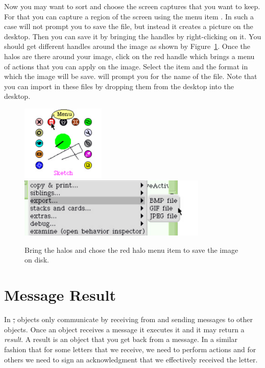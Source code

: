 Now you may want to sort and choose the screen captures that you want to keep. For that you can capture a region of the screen using the menu item . In such a case \sq will not prompt you to save the file, but instead it creates a picture on the \sq desktop.  Then you can save it by bringing the handles by right-clicking on it. You should get different handles around the image as shown by Figure~\ref{sketchWithHalo}. Once the halos are there around your image, click on the red handle which brings a menu of actions that you can apply on the image. Select the  item and the format in which the image will be save. \sq will prompt you for the name of the file. Note that you can import in \sq these files by dropping them from the desktop into the \sq desktop. 



\begin{figure}
\begin{center}
\includegraphics[width=4cm]{sketchWithHalo}
\includegraphics[width=9cm]{sketchExportMenu}
\caption{Bring the halos and chose the red halo menu item  to save the image on disk.} \label{sketchWithHalo}
\end{center}
\end{figure}




\section{Message Result}
In \st, objects only communicate by receiving from and sending messages to other objects. Once an object receives a message it executes it and it may return a  \emph{result}. A result is an object that you get back from a message.
In a similar fashion that for some letters that we receive, we need to perform actions and for others we need to sign an acknowledgment that we effectively received the letter. 

